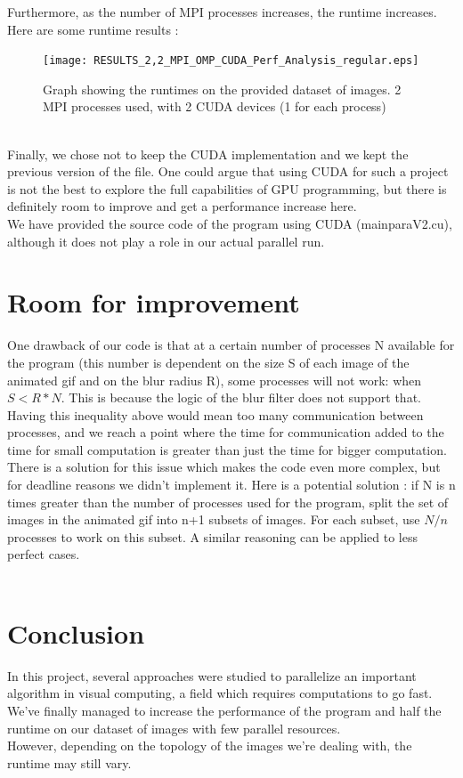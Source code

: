 \documentclass[11pt]{article}
\begin{document}
Furthermore, as the number of MPI processes increases, the runtime increases. Here are some runtime results : \\
\begin{figure}[H]
	\centering
	\texttt{[image: RESULTS\_2,2\_MPI\_OMP\_CUDA\_Perf\_Analysis\_regular.eps]}
	\caption{Graph showing the runtimes on the provided dataset of images. 2 MPI processes used, with 2 CUDA devices (1 for each process)}
	\label{fig:CUDAeval}
\end{figure}
\\
Finally, we chose not to keep the CUDA implementation and we kept the previous version of the file. One could argue that using CUDA for such a project is not the best to explore the full capabilities of GPU programming, but there is definitely room to improve and get a performance increase here. \\
We have provided the source code of the program using CUDA (mainparaV2.cu), although it does not play a role in our actual parallel run. \\
\newpage
\section{Room for improvement}
One drawback of our code is that at a certain number of processes N available for the program (this number is dependent on the size S of each image of the animated gif and on the blur radius R), some processes will not work: when $S < R*N$. This is because the logic of the blur filter does not support that. Having this inequality above would mean too many communication between processes, and we reach a point where the time for communication added to the time for small computation is greater than just the time for bigger computation. \\
There is a solution for this issue which makes the code even more complex, but for deadline reasons we didn’t implement it. Here is a potential solution : if N is n times greater than the number of processes used for the program, split the set of images in the animated gif into n+1 subsets of images. For each subset, use $N/n$ processes to work on this subset. A similar reasoning can be applied to less perfect cases. \\
\\


\section{Conclusion}

In this project, several approaches were studied to parallelize an important algorithm in visual computing, a field which requires computations to go fast. We've finally managed to increase the performance of the program and half the runtime on our dataset of images with few parallel resources. \\
However, depending on the topology of the images we're dealing with, the runtime may still vary. \\ 
\end{document}
